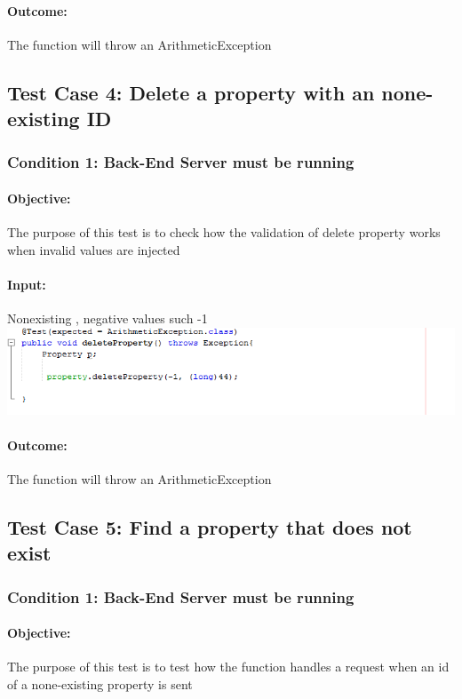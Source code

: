 \documentclass[a4paper,12pt]{article}
\begin{document}
\paragraph{Outcome: } The function will throw an ArithmeticException

\subsection{Test Case 4: Delete a property with an none-existing ID}
\subsubsection{Condition 1: Back-End Server must be running}
\paragraph{Objective:}The purpose of this test is to check how the validation of delete property works when invalid values are injected 
\paragraph{Input:}Nonexisting , negative values such  -1\\
\includegraphics[width=1\textwidth]{./Images/input4.png}

\paragraph{Outcome: } The function will throw an ArithmeticException

\subsection{Test Case 5: Find a property that does not exist}
\subsubsection{Condition 1: Back-End Server must be running}
\paragraph{Objective:}The purpose of this test is to test how the function handles a request when an id of a none-existing property is sent
\end{document}

